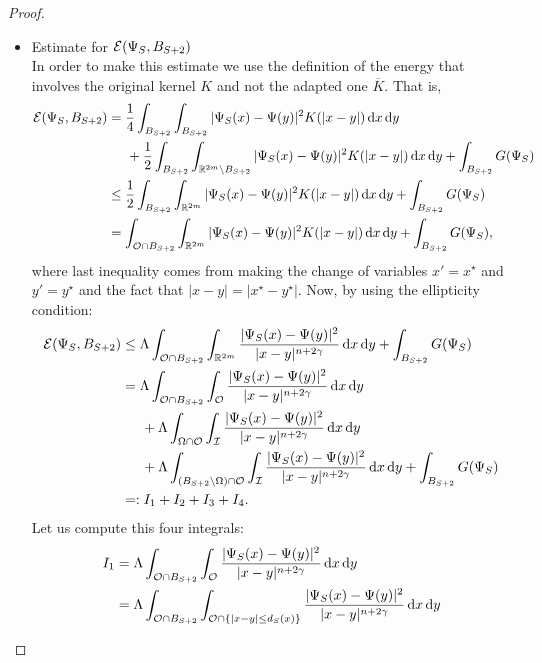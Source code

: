 \begin{proof}

\begin{itemize}
\item Estimate for $\mathcal{E}(\Psi_S,B_{S+2})$\\
In order to make this estimate we use the definition of the energy that involves the original kernel $K$ and not the adapted one $\overline{K}$. That is,
\begin{align*}
\mathcal{E}(\Psi_S,B_{S+2}) &= \frac{1}{4} \int_{B_{S+2}} \int_{B_{S+2}} |\Psi_S(x)-\Psi(y)|^2K(|x-y|) \,\mathrm{d} x\,\mathrm{d} y \\
&\hspace{5mm} +\frac{1}{2} \int_{B_{S+2}} \int_{\mathbb{R}^{2m} \setminus B_{S+2}} |\Psi_S(x)-\Psi(y)|^2K(|x-y|) \,\mathrm{d} x\,\mathrm{d} y + \int_{B_{S+2}} G(\Psi_S) \\
&\leq \frac{1}{2} \int_{B_{S+2}} \int_{\mathbb{R}^{2m}} |\Psi_S(x)-\Psi(y)|^2K(|x-y|) \,\mathrm{d} x\,\mathrm{d} y + \int_{B_{S+2}} G(\Psi_S) \\
&= \int_{\mathcal{O} \cap B_{S+2}} \int_{\mathbb{R}^{2m}} |\Psi_S(x)-\Psi(y)|^2K(|x-y|) \,\mathrm{d} x\,\mathrm{d} y + \int_{B_{S+2}} G(\Psi_S),
\end{align*}
where last inequality comes from making the change of variables $x'=x^\star$ and $y'=y^\star$ and the fact that $|x-y|=|x^\star-y^\star|$. Now, by using the ellipticity condition:
\begin{align*}
\mathcal{E}(\Psi_S,B_{S+2}) &\leq \Lambda \int_{\mathcal{O} \cap B_{S+2}} \int_{\mathbb{R}^{2m}} \frac{|\Psi_S(x)-\Psi(y)|^2}{|x-y|^{n+2\gamma}} \,\mathrm{d} x\,\mathrm{d} y + \int_{B_{S+2}} G(\Psi_S)\\
&= \Lambda \int_{\mathcal{O} \cap B_{S+2}} \int_{\mathcal{O}} \frac{|\Psi_S(x)-\Psi(y)|^2}{|x-y|^{n+2\gamma}} \,\mathrm{d} x\,\mathrm{d} y \\
&\hspace{5mm} + \Lambda \int_{\Omega \cap \mathcal{O}} \int_{\mathcal{I}} \frac{|\Psi_S(x)-\Psi(y)|^2}{|x-y|^{n+2\gamma}} \,\mathrm{d} x\,\mathrm{d} y \\
&\hspace{5mm} + \Lambda \int_{(B_{S+2}\setminus \Omega) \cap \mathcal{O}} \int_{\mathcal{I}} \frac{|\Psi_S(x)-\Psi(y)|^2}{|x-y|^{n+2\gamma}} \,\mathrm{d} x\,\mathrm{d} y + \int_{B_{S+2}} G(\Psi_S) \\
&=:I_1+I_2+I_3+I_4.
\end{align*}
Let us compute this four integrals:
\begin{align*}
I_1 &= \Lambda \int_{\ocal \cap B_{S+2}} \int_{\ocal} \frac{|\Psi_S(x)-\Psi(y)|^2}{|x-y|^{n+2\s}} \d x\d y\\
&= \Lambda \int_{\ocal \cap B_{S+2}} \int_{\ocal\cap\{|x-y|\leq d_S(x)\}} \frac{|\Psi_S(x)-\Psi(y)|^2}{|x-y|^{n+2\s}} \d x\d y\\

\end{align*}
\end{itemize}
\end{proof}
